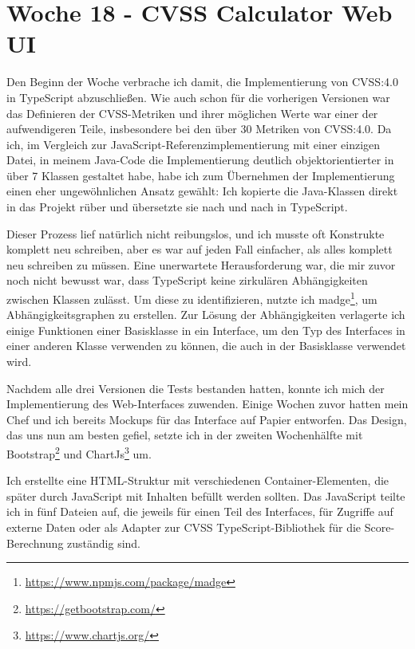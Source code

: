 \section{Woche 18 - CVSS Calculator Web UI} \label{sec:bericht-wo-18}



Den Beginn der Woche verbrache ich damit, die Implementierung von CVSS:4.0 in TypeScript abzuschließen.
Wie auch schon für die vorherigen Versionen war das Definieren der CVSS-Metriken und ihrer möglichen Werte war einer der aufwendigeren Teile, insbesondere bei den über 30 Metriken von CVSS:4.0.
Da ich, im Vergleich zur JavaScript-Referenzimplementierung mit einer einzigen Datei, in meinem Java-Code die Implementierung deutlich objektorientierter in über 7 Klassen gestaltet habe, habe ich zum Übernehmen der Implementierung einen eher ungewöhnlichen Ansatz gewählt:
Ich kopierte die Java-Klassen direkt in das Projekt rüber und übersetzte sie nach und nach in TypeScript.

Dieser Prozess lief natürlich nicht reibungslos, und ich musste oft Konstrukte komplett neu schreiben, aber es war auf jeden Fall einfacher, als alles komplett neu schreiben zu müssen.
Eine unerwartete Herausforderung war, die mir zuvor noch nicht bewusst war, dass TypeScript keine zirkulären Abhängigkeiten zwischen Klassen zulässt.
Um diese zu identifizieren, nutzte ich madge\footnote{\url{https://www.npmjs.com/package/madge}}, um Abhängigkeitsgraphen zu erstellen.
Zur Lösung der Abhängigkeiten verlagerte ich einige Funktionen einer Basisklasse in ein Interface, um den Typ des Interfaces in einer anderen Klasse verwenden zu können, die auch in der Basisklasse verwendet wird.


Nachdem alle drei Versionen die Tests bestanden hatten, konnte ich mich der Implementierung des Web-Interfaces zuwenden.
Einige Wochen zuvor hatten mein Chef und ich bereits Mockups für das Interface auf Papier entworfen.
Das Design, das uns nun am besten gefiel, setzte ich in der zweiten Wochenhälfte mit Bootstrap\footnote{\url{https://getbootstrap.com/}} und ChartJs\footnote{\url{https://www.chartjs.org/}} um.

Ich erstellte eine HTML-Struktur mit verschiedenen Container-Elementen, die später durch JavaScript mit Inhalten befüllt werden sollten.
Das JavaScript teilte ich in fünf Dateien auf, die jeweils für einen Teil des Interfaces, für Zugriffe auf externe Daten oder als Adapter zur CVSS TypeScript-Bibliothek für die Score-Berechnung zuständig sind.

